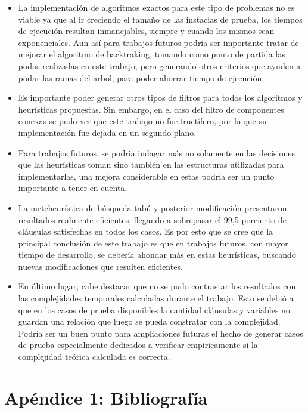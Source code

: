 \documentclass[a4paper,10pt]{article}
\begin{document}
\begin{itemize}
\item La implementaci\'on de algoritmos exactos para este tipo de problemas no es viable ya que al ir creciendo el tama\~{n}o de las instacias de prueba, los tiempos de ejecuci\'on resultan inmanejables, siempre y cuando los mismos sean exponenciales. Aun as\'i para trabajos futuros podr\'ia ser importante tratar de mejorar el algoritmo de backtraking, tomando como punto de partida las podas realizadas en este trabajo, pero generando otros criterios que ayuden a podar las ramas del arbol, para poder ahorrar tiempo de ejecuci\'on.
\item Es importante poder generar otros tipos de filtros para todos los algoritmos y heur\'isticas propuestas. Sin embargo, en el caso del filtro de componentes conexas se pudo ver que este trabajo no fue fruct\'ifero, por lo que su implementaci\'on fue dejada en un segundo plano.
\item Para trabajos futuros, se podria indagar m\'as no solamente en las decisiones que las heur\'isticas toman sino tambi\'en en las estructuras utilizadas para implementarlas, una mejora considerable en estas podr\'ia ser un punto importante a tener en cuenta.
\item La meteheur\'istica de b\'usqueda tab\'u y posterior modificaci\'on presentaron resultados realmente eficientes, llegando a sobrepasar el 99,5 porciento de cl\'ausulas satisfechas en todos los casos. Es por esto que se cree que la principal conclusi\'on de este trabajo es que en trabajos futuros, con mayor tiempo de desarrollo, se deber\'ia ahondar m\'as en estas heur\'isticas, buscando nuevas modificaciones que resulten eficientes. 
\item En \'ultimo lugar, cabe destacar que no se pudo contrastar los resultados con las complejidades temporales calculadas durante el trabajo. Esto se debi\'o a que en los casos de prueba disponibles la cantidad cl\'ausulas y variables no guardan una relaci\'on que luego se pueda constratar con la complejidad. Podr\'ia ser un buen punto para ampliaciones futuras el hecho de generar casos de prueba especialmente dedicados a verificar empiricamente si la complejidad te\'orica calculada es correcta.
\end{itemize}

\newpage
\section*{Ap\'endice 1: Bibliograf\'ia}
\end{document}
